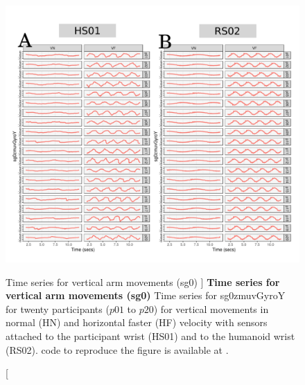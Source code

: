 \begin{figure}
\centering
\includegraphics[width=1.0\textwidth]{ts_V_sg0}
    	\caption
	[Time series for vertical arm movements (sg0) ]{
	{\bf Time series for vertical arm movements (sg0)}
		Time series for sg0zmuvGyroY for twenty participants 
		($p01$ to  $p20$) 
		for vertical movements in normal (HN) and horizontal faster (HF) 
		velocity with sensors attached to the participant wrist (HS01)
		and to the humanoid wrist (RS02).
	\R code to reproduce the figure is available at 
	.
        }
    \label{fig:aV-sg0}
\end{figure}

